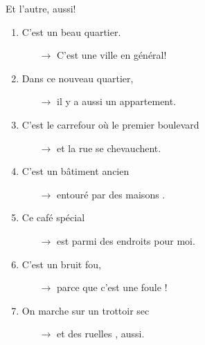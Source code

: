 \begin{frame}{Et l'autre, aussi!}
  \begin{enumerate}
    \item C'est un \alert{beau} quartier.
    \begin{itemize}
      \item[$\to$] C'est une \underline{} ville en général!
    \end{itemize}
    \item Dans ce \alert{nouveau} quartier,
    \begin{itemize}
      \item[$\to$] il y a aussi un \underline{} appartement.
    \end{itemize}
    \item C'est le carrefour où le \alert{premier} boulevard
    \begin{itemize}
      \item[$\to$] et la \underline{} rue se chevauchent.
    \end{itemize}
    \item C'est un bâtiment \alert{ancien}
    \begin{itemize}
      \item[$\to$] entouré par des maisons \underline{}.
    \end{itemize}
    \item Ce café \alert{spécial}
    \begin{itemize}
      \item[$\to$] est parmi des endroits \underline{} pour moi.
    \end{itemize}
    \item C'est un bruit \alert{fou},
    \begin{itemize}
      \item[$\to$] parce que c'est une foule \underline{}!
    \end{itemize}
    \item On marche sur un trottoir \alert{sec}
    \begin{itemize}
      \item[$\to$] et des ruelles \underline{}, aussi.
    \end{itemize}
  \end{enumerate}
\end{frame}